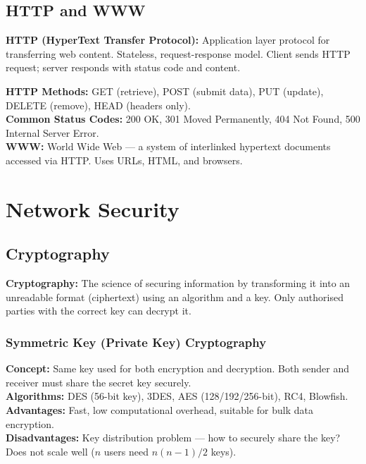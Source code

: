 \documentclass[12pt,a4paper]{article}
\begin{document}
\subsection{HTTP and WWW}

\begin{tcolorbox}[defbox]
\textbf{HTTP (HyperText Transfer Protocol):} Application layer protocol for transferring web content. Stateless, request-response model. Client sends HTTP request; server responds with status code and content.
\end{tcolorbox}

\textbf{HTTP Methods:} GET (retrieve), POST (submit data), PUT (update), DELETE (remove), HEAD (headers only).\\
\textbf{Common Status Codes:} 200 OK, 301 Moved Permanently, 404 Not Found, 500 Internal Server Error.\\
\textbf{WWW:} World Wide Web --- a system of interlinked hypertext documents accessed via HTTP. Uses URLs, HTML, and browsers.

\section{Network Security}

\subsection{Cryptography}

\begin{tcolorbox}[defbox]
\textbf{Cryptography:} The science of securing information by transforming it into an unreadable format (ciphertext) using an algorithm and a key. Only authorised parties with the correct key can decrypt it.
\end{tcolorbox}

\subsubsection*{Symmetric Key (Private Key) Cryptography}
\begin{tcolorbox}[formulabox, title={\textbf{Symmetric Key Cryptography}}]
\textbf{Concept:} Same key used for both encryption and decryption. Both sender and receiver must share the secret key securely.\\[4pt]
\textbf{Algorithms:} DES (56-bit key), 3DES, AES (128/192/256-bit), RC4, Blowfish.\\[4pt]
\textbf{Advantages:} Fast, low computational overhead, suitable for bulk data encryption.\\
\textbf{Disadvantages:} Key distribution problem --- how to securely share the key? Does not scale well ($n$ users need $n(n-1)/2$ keys).
\end{tcolorbox}
\end{document}
